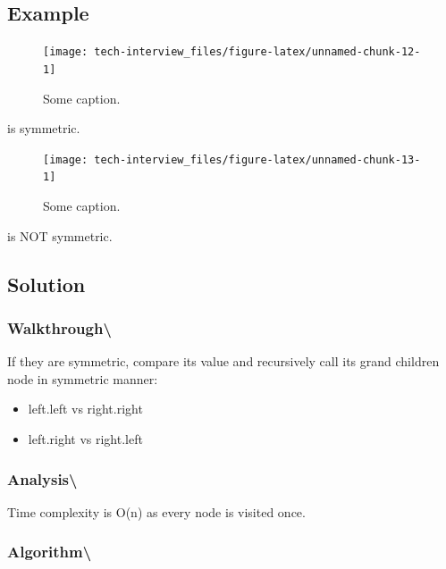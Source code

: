 \documentclass[]{book}
\providecommand{\tightlist}{%
  \setlength{\itemsep}{0pt}\setlength{\parskip}{0pt}}
\begin{document}
\hypertarget{example-51}{%
\subsection{Example}\label{example-51}}

\begin{figure}
\texttt{[image: tech-interview\_files/figure-latex/unnamed-chunk-12-1]} \caption{Some caption.}\label{fig:unnamed-chunk-12}
\end{figure}

is symmetric.

\begin{figure}
\texttt{[image: tech-interview\_files/figure-latex/unnamed-chunk-13-1]} \caption{Some caption.}\label{fig:unnamed-chunk-13}
\end{figure}

is NOT symmetric.

\hypertarget{solution-36}{%
\subsection{Solution}\label{solution-36}}

\hypertarget{walkthrough-53}{%
\subsubsection{Walkthrough\textbackslash{}}\label{walkthrough-53}}

If they are symmetric, compare its value and recursively call its grand children node in symmetric manner:

\begin{itemize}
\tightlist
\item
  left.left vs right.right
\item
  left.right vs right.left
\end{itemize}

\hypertarget{analysis-60}{%
\subsubsection{Analysis\textbackslash{}}\label{analysis-60}}

Time complexity is O(n) as every node is visited once.

\hypertarget{algorithm-62}{%
\subsubsection{Algorithm\textbackslash{}}\label{algorithm-62}}
\end{document}
